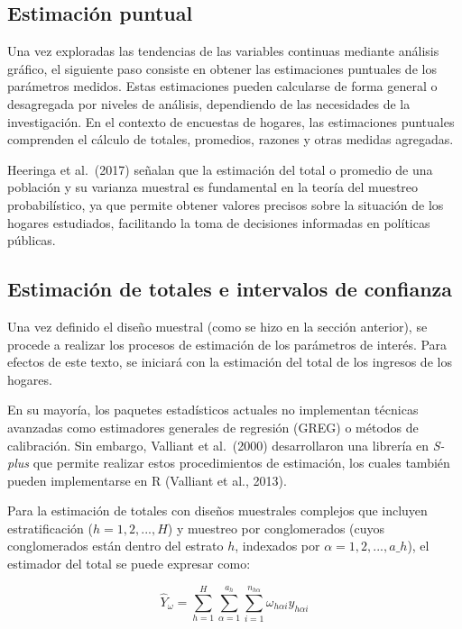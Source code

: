 \documentclass[
  12pt,
]{book}
\begin{document}
\subsection{Estimación puntual}\label{estimaciuxf3n-puntual}

Una vez exploradas las tendencias de las variables continuas mediante análisis gráfico, el siguiente paso consiste en obtener las estimaciones puntuales de los parámetros medidos. Estas estimaciones pueden calcularse de forma general o desagregada por niveles de análisis, dependiendo de las necesidades de la investigación. En el contexto de encuestas de hogares, las estimaciones puntuales comprenden el cálculo de totales, promedios, razones y otras medidas agregadas.

Heeringa et al.~(2017) señalan que la estimación del total o promedio de una población y su varianza muestral es fundamental en la teoría del muestreo probabilístico, ya que permite obtener valores precisos sobre la situación de los hogares estudiados, facilitando la toma de decisiones informadas en políticas públicas.

\subsection{Estimación de totales e intervalos de confianza}\label{estimaciuxf3n-de-totales-e-intervalos-de-confianza}

Una vez definido el diseño muestral (como se hizo en la sección anterior), se procede a realizar los procesos de estimación de los parámetros de interés. Para efectos de este texto, se iniciará con la estimación del total de los ingresos de los hogares.

En su mayoría, los paquetes estadísticos actuales no implementan técnicas avanzadas como estimadores generales de regresión (GREG) o métodos de calibración. Sin embargo, Valliant et al.~(2000) desarrollaron una librería en \emph{S-plus} que permite realizar estos procedimientos de estimación, los cuales también pueden implementarse en R (Valliant et al., 2013).

Para la estimación de totales con diseños muestrales complejos que incluyen estratificación (\(h=1,2,...,H\)) y muestreo por conglomerados (cuyos conglomerados están dentro del estrato \(h\), indexados por \(\alpha=1,2,...,a\_h\)), el estimador del total se puede expresar como:

\[
\hat{Y}_{\omega} = \sum_{h=1}^{H}\sum_{\alpha=1}^{a_h}\sum_{i=1}^{n_{h\alpha}}\omega_{h\alpha i} y_{h\alpha i}
\]
\end{document}
